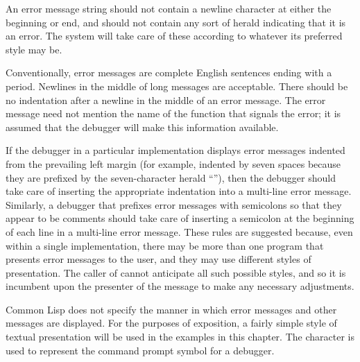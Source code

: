 An error message string should not contain a newline character
at either the beginning or end, and should not contain any sort of
herald indicating that it is an error.  The system will take care of
these according to whatever its preferred style may be.  

Conventionally,
error messages are complete English sentences ending with a period.
Newlines in the middle of long messages are acceptable.  There
should be no indentation after a newline in the middle of an
error message.  The error message need not mention the name of the function
that signals the error; it is assumed that the debugger will make this
information available.

\beforenoterule
\begin{implementation}
If the debugger in a particular implementation
displays error messages indented from the prevailing left margin
(for example, indented by seven spaces because
they are prefixed by the seven-character herald ``''),
then the debugger should take care of inserting
the appropriate indentation into a multi-line error message.
Similarly, a debugger that prefixes error messages with semicolons
so that they appear to be comments
should take care of inserting a semicolon at the beginning of each
line in a multi-line error message.  These rules are suggested
because, even within a single
implementation, there may be more than one program that presents error
messages to the user, and they may use different styles of
presentation.  The caller
of  cannot anticipate all such possible styles,
and so it is incumbent upon the presenter of the message
to make any necessary adjustments.
\end{implementation}
\afternoterule

Common Lisp does not specify the manner in which error messages and
other messages are displayed.  For the purposes of exposition,
a fairly simple style of textual presentation will be used in the
examples in this chapter.  The character \cdf{>} is used
to represent the command prompt symbol for a debugger.

